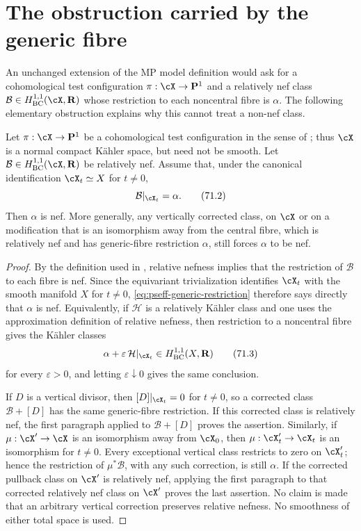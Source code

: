 \section{The obstruction carried by the generic fibre}
\label{sec:pseff-generic-fibre}

An unchanged extension of the MP model definition would ask for a
cohomological test configuration
$\pi:\cX\to\mathbf P^1$ and a relatively nef class
$\mathcal B\in H^{1,1}_{\mathrm{BC}}(\cX,\mathbf R)$ whose restriction to
each noncentral fibre is $\alpha$.  The following elementary obstruction
explains why this cannot treat a non-nef class.

\begin{proposition}\label{prop:pseff-relative-nef-obstruction}
Let $\pi:\cX\to\mathbf P^1$ be a cohomological test configuration in
the sense of \cite[Definitions~2.5.1 and 4.1.2]{MP24}; thus $\cX$ is a
normal compact K\"ahler space, but need not be smooth.  Let
$\mathcal B\in H^{1,1}_{\mathrm{BC}}(\cX,\mathbf R)$ be relatively nef.
Assume that, under the canonical identification
$\cX_t\simeq X$ for $t\ne0$,
\[
                        \mathcal B|_{\cX_t}=\alpha.
\tag{71.2}\label{eq:pseff-generic-restriction}
\]
Then $\alpha$ is nef.  More generally, any vertically corrected class,
on $\cX$ or on a modification that is an isomorphism away from the
central fibre, which is relatively nef and has generic-fibre restriction
$\alpha$, still forces $\alpha$ to be nef.
\end{proposition}

\begin{proof}
By the definition used in \cite[Definition~4.1.2]{MP24}, relative
nefness implies that the restriction of $\mathcal B$ to each fibre is
nef.  Since the equivariant trivialization identifies $\cX_t$ with the
smooth manifold $X$ for $t\ne0$,
\eqref{eq:pseff-generic-restriction} therefore says directly that
$\alpha$ is nef.  Equivalently, if $\mathcal H$ is a relatively K\"ahler
class and one uses the approximation definition of relative nefness, then
restriction to a noncentral fibre gives the K\"ahler classes
\[
        \alpha+\varepsilon\,\mathcal H|_{\cX_t}
              \in H^{1,1}_{\mathrm{BC}}(X,\mathbf R)
\tag{71.3}\label{eq:pseff-nef-restriction}
\]
for every $\varepsilon>0$, and letting $\varepsilon\downarrow0$ gives
the same conclusion.

If $D$ is a vertical divisor, then
$[D]|_{\cX_t}=0$ for $t\ne0$, so a corrected class
$\mathcal B+[D]$ has the same generic-fibre restriction.  If this
corrected class is relatively nef, the first paragraph applied to
$\mathcal B+[D]$ proves the assertion.  Similarly, if
$\mu:\cX'\to\cX$ is an isomorphism away from $\cX_0$, then
$\mu:\cX'_t\to\cX_t$ is an isomorphism for $t\ne0$.  Every exceptional
vertical class restricts to zero on $\cX'_t$; hence the restriction of
$\mu^*\mathcal B$, with any such correction, is still $\alpha$.
If the corrected pullback class on $\cX'$ is relatively nef, applying
the first paragraph to that corrected relatively nef class on $\cX'$
proves the last assertion.  No claim is made that an arbitrary vertical
correction preserves relative nefness.  No smoothness of either total
space is used.
\end{proof}

